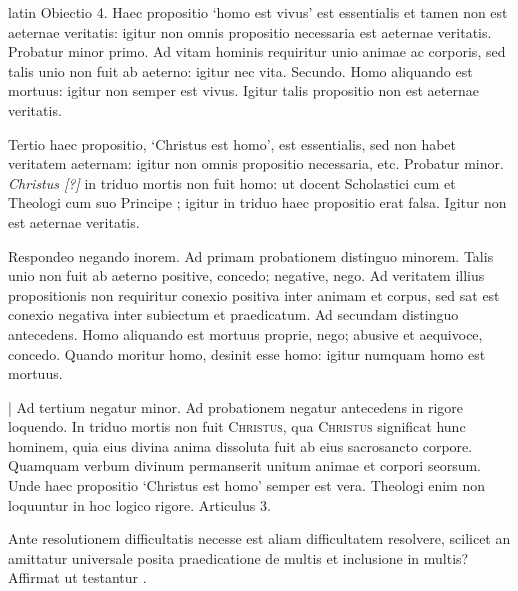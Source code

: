 \begin{otherlanguage*}{latin}
\pstart
  Obiectio 4. Haec propositio `homo est vivus' est essentialis et tamen non est aeternae veritatis: igitur non omnis propositio necessaria est aeternae veritatis. Probatur minor primo. Ad vitam hominis requiritur unio animae ac corporis, sed talis unio non fuit ab aeterno: igitur nec vita. Secundo. Homo aliquando est mortuus: igitur non semper est vivus. Igitur talis propositio non est aeternae veritatis. 
\pend

\pstart
  Tertio haec propositio, `Christus est homo', est essentialis, sed non habet veritatem aeternam: igitur non omnis propositio necessaria, etc. Probatur minor. \emph{Christus [?]} in triduo mortis non fuit homo: ut docent Scholastici cum  et Theologi cum suo Principe ; igitur in triduo haec propositio erat falsa. Igitur non est aeternae veritatis. 
\pend

\pstart
  Respondeo negando inorem. Ad primam probationem distinguo minorem. Talis unio non fuit ab aeterno positive, concedo; negative, nego. Ad veritatem illius propositionis non requiritur conexio positiva inter animam et corpus, sed sat est conexio negativa inter subiectum et praedicatum. Ad secundam distinguo antecedens. Homo aliquando est mortuus proprie, nego; abusive et aequivoce, concedo. Quando moritur homo, desinit esse homo: igitur numquam homo est mortuus. 
\pend

\pstart
  \textnormal{|}   Ad tertium negatur minor. Ad probationem negatur antecedens in rigore loquendo. In triduo mortis non fuit \textsc{Christus}, qua \textsc{Christus} significat hunc hominem, quia eius divina anima dissoluta fuit ab eius sacrosancto corpore. Quamquam verbum divinum permanserit unitum animae et corpori seorsum. Unde haec propositio `Christus est homo' semper est vera. Theologi enim non loquuntur in hoc logico rigore. Articulus 3. 
\pend

\pstart
  Ante resolutionem difficultatis necesse est aliam difficultatem resolvere, scilicet an amittatur universale posita praedicatione de multis et inclusione in multis? Affirmat  ut testantur . 
\pend


\end{otherlanguage*}
